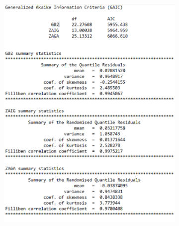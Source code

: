 \documentclass[
]{article}
\begin{document}
\begin{figure}
\centering
\begin{subfigure}[b]{0.5\textwidth}
   \includegraphics[width=1\linewidth]{GAIC_statistics.eps}
   \caption{}
   \label{Residuals summary statistics} 
\end{subfigure}


\end{figure}
\end{document}
